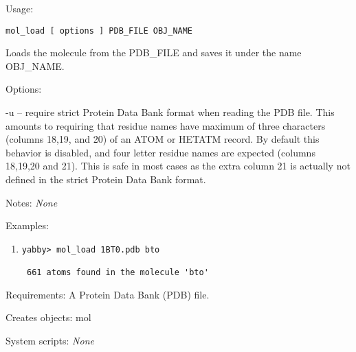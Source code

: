 \begin{description}


\item{Usage:}

{\tt mol\_load [ options ] PDB\_FILE OBJ\_NAME}

Loads the molecule from the PDB\_FILE and saves it under
the name OBJ\_NAME.


\item{Options:}
\begin{description}
\item -u -- require strict Protein Data Bank format when reading
 the PDB file. This amounts to requiring that residue names
 have maximum of three characters (columns 18,19, and 20) of
 an ATOM or HETATM record. By default this behavior is disabled,
 and four letter residue names are expected (columns 18,19,20
 and 21). This is safe in most cases as the extra column 21 is
 actually not defined in the strict Protein Data Bank format.
\end{description}


\item{Notes:} {\em None}


\item{Examples:}
\begin{enumerate}

\item
\begin{verbatim}
yabby> mol_load 1BT0.pdb bto

 661 atoms found in the molecule 'bto'

\end{verbatim}

\end{enumerate}


\item{Requirements:} A Protein Data Bank (PDB) file.


\item{Creates objects:} mol


\item{System scripts:} {\em None}

\end{description}

